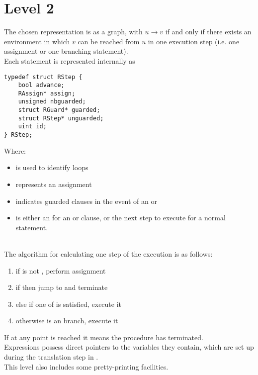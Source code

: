 \section{Level 2}

The chosen representation is as a graph, with \(u \to v\) if and only
if there exists an environment in which \(v\) can be reached from \(u\)
in one execution step (i.e. one assignment or one branching statement).\\

Each statement is represented internally as
\begin{lstlisting}
typedef struct RStep {
    bool advance;
    RAssign* assign;
    unsigned nbguarded;
    struct RGuard* guarded;
    struct RStep* unguarded;
    uint id;
} RStep;
\end{lstlisting}
Where:
\begin{itemize}
    \item {} is used to identify loops
    \item {} represents an assignment
    \item {} indicates guarded clauses in the event of an
         or 
    \item {} is either an  for an  or 
        clause, or the next step to execute for a normal statement.
\end{itemize}~\\

The algorithm for calculating one step of the execution is as follows:
\begin{enumerate}
    \item if  is not , perform assignment
    \item if  then jump to  and terminate
    \item else if one of  is satisfied, execute it
    \item otherwise  is an  branch, execute it
\end{enumerate}
If at any point  is reached it means the procedure has terminated.\\

Expressions possess direct pointers to the variables they contain, which are
set up during the translation step in .\\

This level also includes some pretty-printing facilities.


